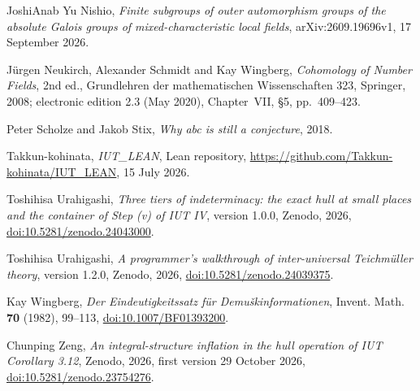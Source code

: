 \documentclass[11pt,a4paper]{article}
\theoremstyle{plain}
\theoremstyle{definition}
\theoremstyle{remark}
\begin{document}
\begin{thebibliography}{JoshiAnab}
Yu Nishio, \emph{Finite subgroups of outer automorphism groups of the absolute Galois groups of mixed-characteristic
local fields}, arXiv:2609.19696v1, 17 September 2026.

J\"urgen Neukirch, Alexander Schmidt and Kay Wingberg, \emph{Cohomology of Number Fields}, 2nd ed., Grundlehren der
mathematischen Wissenschaften 323, Springer, 2008; electronic edition 2.3 (May 2020), Chapter~VII, \S5, pp.~409--423.

Peter Scholze and Jakob Stix, \emph{Why abc is still a conjecture}, 2018.

Takkun-kohinata, \emph{IUT\_LEAN}, Lean repository, \url{https://github.com/Takkun-kohinata/IUT_LEAN}, 15 July 2026.

Toshihisa Urahigashi, \emph{Three tiers of indeterminacy: the exact hull at small places and the container of Step (v)
of IUT IV}, version 1.0.0, Zenodo, 2026, \href{https://doi.org/10.5281/zenodo.24043000}{doi:10.5281/zenodo.24043000}.

Toshihisa Urahigashi, \emph{A programmer's walkthrough of inter-universal Teichm\"uller theory}, version 1.2.0, Zenodo,
2026, \href{https://doi.org/10.5281/zenodo.24039375}{doi:10.5281/zenodo.24039375}.

Kay Wingberg, \emph{Der Eindeutigkeitssatz f\"ur Demu\v{s}kinformationen}, Invent. Math. \textbf{70} (1982),
99--113, \href{https://doi.org/10.1007/BF01393200}{doi:10.1007/BF01393200}.

Chunping Zeng, \emph{An integral-structure inflation in the hull operation of IUT Corollary 3.12}, Zenodo, 2026,
first version 29 October 2026, \href{https://doi.org/10.5281/zenodo.23754276}{doi:10.5281/zenodo.23754276}.
\end{thebibliography}
\end{document}
